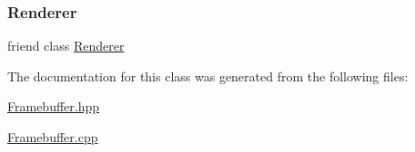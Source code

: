 \subsubsection{\texorpdfstring{Renderer}{Renderer}}
{\footnotesize\ttfamily friend class \mbox{\hyperlink{class_saturn_1_1_renderer}{Renderer}}\hspace{0.3cm}{\ttfamily [friend]}}



The documentation for this class was generated from the following files\+:\begin{DoxyCompactItemize}
\item 
\mbox{\hyperlink{_framebuffer_8hpp}{Framebuffer.\+hpp}}\item 
\mbox{\hyperlink{_framebuffer_8cpp}{Framebuffer.\+cpp}}\end{DoxyCompactItemize}
